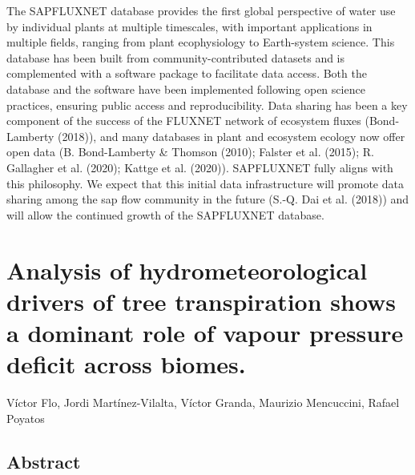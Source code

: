 \documentclass[11pt,twoside]{reedthesis}
\begin{document}
The SAPFLUXNET database provides the first global perspective of water
use by individual plants at multiple timescales, with important
applications in multiple fields, ranging from plant ecophysiology to
Earth-system science. This database has been built from
community-contributed datasets and is complemented with a software
package to facilitate data access. Both the database and the software
have been implemented following open science practices, ensuring public
access and reproducibility. Data sharing has been a key component of the
success of the FLUXNET network of ecosystem fluxes (Bond-Lamberty
(2018)), and many databases in plant and ecosystem ecology now offer
open data (B. Bond-Lamberty \& Thomson (2010); Falster et al. (2015); R.
Gallagher et al. (2020); Kattge et al. (2020)). SAPFLUXNET fully aligns
with this philosophy. We expect that this initial data infrastructure
will promote data sharing among the sap flow community in the future
(S.-Q. Dai et al. (2018)) and will allow the continued growth of the
SAPFLUXNET database.

\chapter[Analysis of hydrometeorological drivers.]{Analysis of hydrometeorological drivers of tree transpiration shows a dominant role of vapour pressure deficit across biomes.}

\setlength{\parindent}{0pt} Víctor Flo, Jordi Martínez-Vilalta, Víctor
Granda, Maurizio Mencuccini, Rafael Poyatos \newpage
\setlength{\parindent}{30pt}

\section*{Abstract}
\end{document}
